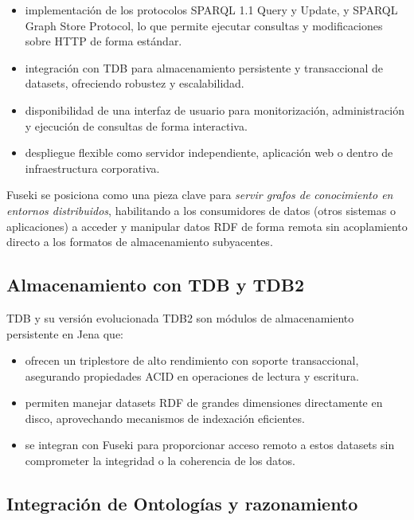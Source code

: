 \documentclass{article}
\begin{document}
\begin{itemize}
    \item implementación de los protocolos SPARQL 1.1 Query y Update, y SPARQL Graph Store Protocol, lo que permite ejecutar consultas y modificaciones sobre HTTP de forma estándar. 

    \item integración con TDB para almacenamiento persistente y transaccional de datasets, ofreciendo robustez y escalabilidad. 
    \item disponibilidad de una interfaz de usuario para monitorización, administración y ejecución de consultas de forma interactiva.

    \item despliegue flexible como servidor independiente, aplicación web o dentro de infraestructura corporativa.
\end{itemize}

Fuseki se posiciona como una pieza clave para \textit{servir grafos de conocimiento en entornos distribuidos}, habilitando a los consumidores de datos (otros sistemas o aplicaciones) a acceder y manipular datos RDF de forma remota sin acoplamiento directo a los formatos de almacenamiento subyacentes.
\subsection{Almacenamiento con TDB y TDB2}

TDB y su versión evolucionada TDB2 son módulos de almacenamiento persistente en Jena que:

\begin{itemize}
    \item ofrecen un triplestore de alto rendimiento con soporte transaccional, asegurando propiedades ACID en operaciones de lectura y escritura.

    \item permiten manejar datasets RDF de grandes dimensiones directamente en disco, aprovechando mecanismos de indexación eficientes.

    \item se integran con Fuseki para proporcionar acceso remoto a estos datasets sin comprometer la integridad o la coherencia de los datos. 
\end{itemize}

\subsection{Integración de Ontologías y razonamiento}
\end{document}
